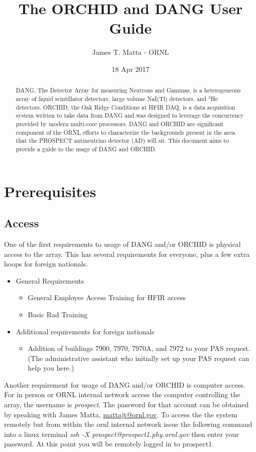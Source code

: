 \documentclass[onecolumn, 10pt, letterpaper, twoside]{article}
\newcommand{\nuc}[2] {$^{#1}$#2}
\begin{document}
\title{The ORCHID and DANG User Guide}
\author{James T. Matta - ORNL}
\date{18 Apr 2017}

\maketitle
\begin{abstract}
DANG, The Detector Array for measuring Neutrons and Gammas, is a heterogeneous array of liquid scintillator detectors, large volume NaI(Tl) detectors, and \nuc{3}{He} detectors. ORCHID, the Oak Ridge Conditions at HFIR DAQ, is a data acquisition system written to take data from DANG and was designed to leverage the concurrency provided by modern multi-core processors. DANG and ORCHID are significant component of the ORNL efforts to characterize the backgrounds present in the area that the PROSPECT antineutrino detector (AD) will sit. This document aims to provide a guide to the usage of DANG and ORCHID.
\end{abstract}
\tableofcontents
\clearpage{}
\section{Prerequisites}
\subsection{Access}
One of the first requirements to usage of DANG and/or ORCHID is physical access to the array. This has several requirements for everyone, plus a few extra hoops for foreign nationals.
\begin{itemize}
\item General Requirements
\begin{itemize}
\item General Employee Access Training for HFIR access
\item Basic Rad Training
\end{itemize}
\item Additional requirements for foreign nationals
\begin{itemize}
\item Addition of buildings 7900, 7970, 7970A, and 7972 to your PAS request. (The administrative assistant who initially set up your PAS request can help you here.)
\end{itemize}
\end{itemize}
Another requirement for usage of DANG and/or ORCHID is computer access. For in person or ORNL internal network access the computer controlling the array, the username is \emph{prospect}. The password for that account can be obtained by speaking with James Matta, \href{mailto:mattajt@ornl.gov}{mattajt@ornl.gov}. To access the the system remotely but from within the ornl internal network issue the following command into a linux terminal \emph{ssh -X prospect@prospect1.phy.ornl.gov} then enter your password. At this point you will be remotely logged in to prospect1.
\end{document}
